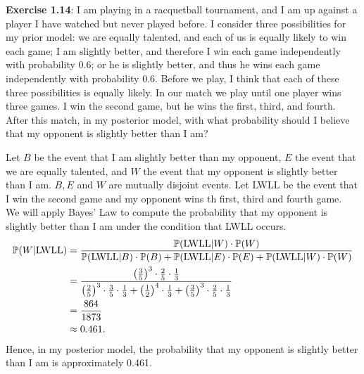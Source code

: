 \textbf{Exercise 1.14}: I am playing in a racquetball tournament, and I am up against a player I have watched but never played before. I consider three possibilities for my prior model: we are equally talented, and each of us is equally likely to win each game; I am slightly better, and therefore I win each game independently with probability 0.6; or he is slightly better, and thus he wins each game independently with probability 0.6. Before we play, I think that each of these three possibilities is equally likely.
In our match we play until one player wins three games. I win the second game, but he wins the first, third, and fourth. After this match, in my posterior model, with what probability should I believe that my opponent is slightly better than I am?

Let $B$ be the event that I am slightly better than my opponent, $E$ the event that
we are equally talented, and $W$ the event that my opponent is slightly better than
I am. $B, E$ and $W$ are mutually disjoint events. Let LWLL be the event that I
win the second game and my opponent wins th first, third and fourth game. \\
We will apply Bayes' Law to compute the probability that my opponent is slightly
better than I am under the condition that LWLL occurs.
\begin{align*}
  \mathbb{P}(W|\text{LWLL})
    &= \frac{\mathbb{P}(\text{LWLL}|W) \cdot \mathbb{P}(W)}{\mathbb{P}(\text{LWLL}|B) \cdot \mathbb{P}(B) + \mathbb{P}(\text{LWLL}|E) \cdot \mathbb{P}(E) + \mathbb{P}(\text{LWLL}|W) \cdot \mathbb{P}(W)} \\
    &= \frac{\left(\frac{3}{5}\right)^3 \cdot \frac{2}{5} \cdot \frac{1}{3}} {\left( \frac{2}{5} \right)^3 \cdot \frac{3}{5} \cdot \frac{1}{3} + \left( \frac{1}{2} \right) ^4 \cdot \frac{1}{3} + \left(\frac{3}{5}\right)^3 \cdot \frac{2}{5} \cdot \frac{1}{3}} \\
    &= \frac{864}{1873} \\
    &\approx 0.461.
\end{align*}
Hence, in my posterior model, the probability that my opponent is slightly better
than I am is approximately 0.461.
\\[0.5cm]
